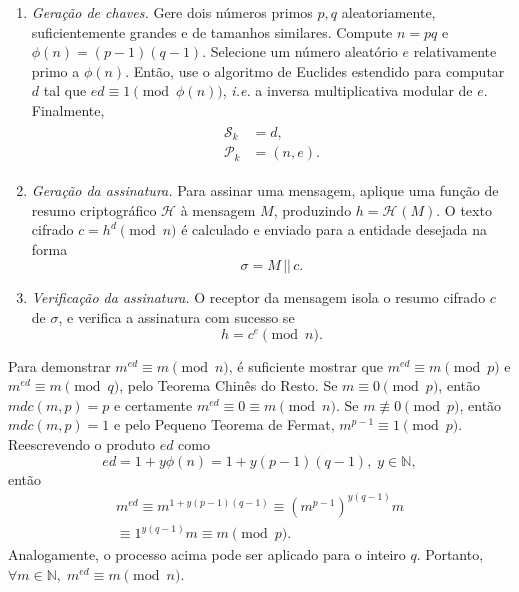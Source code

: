 \documentclass{ufsctex/ufsctex}
\newcommand{\hh}{\mathcal{H}}
\newcommand{\pk}{\mathcal{P}_{k}}
\newcommand{\sk}{\mathcal{S}_{k}}
\newcommand{\hash}[2][]{\mathcal{H}^{#1} (#2)}
\newcommand{\concat}{\, \vert{} \vert{} \,}
\begin{document}
\begin{enumerate}

  \item[] \emph{Geração de chaves.} Gere dois números primos $p, q$
      aleatoriamente, suficientemente grandes e de tamanhos similares. Compute
        $n = p q$ e $\phi(n) = (p - 1) (q - 1)$. Selecione um número aleatório
        $e$ relativamente primo a $\phi(n)$. Então, use o algoritmo de Euclides
        estendido para computar $d$ tal que $ed \equiv 1 \pmod{\phi(n)}$,
        \emph{i.e.} a inversa multiplicativa modular de $e$. Finalmente,
        \begin{align}
          \begin{split}
            \sk{} &= d, \\
            \pk{} &= (n, e).
          \end{split}
        \end{align}

  \item[] \emph{Geração da assinatura.} Para assinar uma mensagem, aplique uma
      função de resumo criptográfico $\hh{}$ à mensagem $M$, produzindo $h =
        \hash{M}$. O texto cifrado $c = h^{d} \pmod{n}$ é calculado e enviado
        para a entidade desejada na forma
        \begin{equation}
          \sigma = M \concat c.
        \end{equation}

  \item[] \emph{Verificação da assinatura.} O receptor da mensagem isola o
      resumo cifrado $c$ de $\sigma$, e verifica a assinatura com sucesso se
      \begin{equation}
        h = c^{e} \pmod{n}.
      \end{equation}

\end{enumerate}

Para demonstrar $m^{ed} \equiv m \pmod{n}$, é suficiente mostrar que $m^{ed}
\equiv m \pmod{p}$ e $m^{ed} \equiv m \pmod{q}$, pelo Teorema Chinês do Resto.
Se $m \equiv 0 \pmod{p}$, então $mdc(m, p) = p$ e certamente $m^{ed} \equiv 0
\equiv m \pmod{n}$.  Se $m \not\equiv 0 \pmod{p}$, então $mdc(m, p) = 1$ e pelo
Pequeno Teorema de Fermat, $m^{p - 1} \equiv 1 \pmod{p}$. Reescrevendo o
produto $ed$ como
\begin{equation}
  ed = 1 + y\phi(n) = 1 + y(p - 1)(q - 1), \; y \in \mathbb{N},
\end{equation}
então
\begin{multline}
  m^{ed} \equiv m^{1 + y(p - 1)(q - 1)}
    \equiv {(m^{p - 1})}^{y(q - 1)}m \\
    \equiv 1^{y(q - 1)}m \equiv m \pmod{p}.
\end{multline}
Analogamente, o processo acima pode ser aplicado para o inteiro $q$. Portanto,
$\forall m \in \mathbb{N}, \; m^{ed} \equiv m \pmod{n}$.
\end{document}
